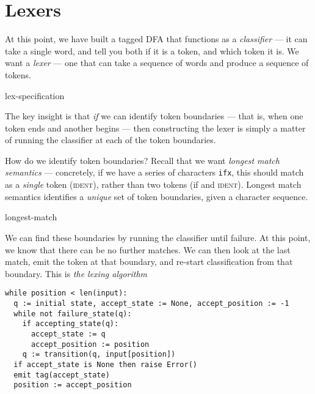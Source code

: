 \section{Lexers}
At this point, we have built a tagged DFA that functions as a \emph{classifier} --- it can take a single word, and tell you both if it is a token, and which token it is. We want a \emph{lexer} --- one that can take a sequence of words and produce a sequence of tokens. 

\begin{center}
{lex-specification}
\end{center}

The key insight is that \emph{if} we can identify token boundaries --- that is, when one token ends and another begins --- then constructing the lexer is simply a matter of running the classifier at each of the token boundaries.

How do we identify token boundaries? Recall that we want \emph{longest match semantics} --- concretely, if we have a series of characters \texttt{ifx}, this should match as a \emph{single} token (\textsc{ident}), rather than two tokens (\textsf{if} and \textsc{ident}). Longest match semantics identifies a \emph{unique} set of token boundaries, given a character sequence. 

\begin{center}
\vspace{5mm}
{longest-match}
\end{center}

We can find these boundaries by running the classifier until failure. At this point, we know that there can be no further matches. We can then look at the last match, emit the token at that boundary, and re-start classification from that boundary. This is \emph{the lexing algorithm} 

\begin{code}
\begin{lstlisting}[style=pseudocode]
while position < len(input):
  q := initial state, accept_state := None, accept_position := -1
  while not failure_state(q):
    if accepting_state(q):
      accept_state := q   
      accept_position := position
    q := transition(q, input[position])
  if accept_state is None then raise Error()  
  emit tag(accept_state)
  position := accept_position
\end{lstlisting}
\vspace{2mm}
\end{code}


